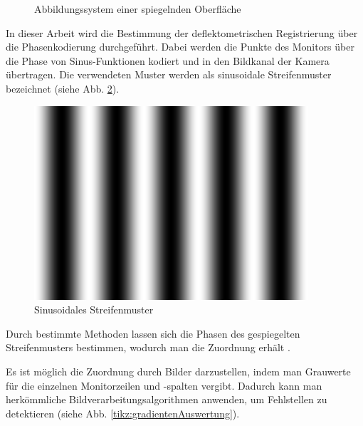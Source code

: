 \documentclass[ngerman,11pt,twocolumn,a4paper]{article}
\begin{document}
\begin{figure}[H]
\begin{adjustbox}{width=\columnwidth}
		\end{adjustbox}
		\caption{Abbildungssystem einer spiegelnden Oberfläche}
		\label{tikz:abbildungssystem}
	\end{figure}
	
	In dieser Arbeit wird die Bestimmung der deflektometrischen Registrierung über die Phasenkodierung durchgeführt.
	Dabei werden die Punkte des Monitors über die Phase von Sinus-Funktionen kodiert und in den Bildkanal der Kamera übertragen.
	Die verwendeten Muster werden als sinusoidale Streifenmuster bezeichnet (siehe Abb. \ref{img:sinusoidalesMuster}).
	\begin{figure}[H]
		 \centering
		 \includegraphics[frame,width=0.4\columnwidth]{m_1_3}
		 \caption{Sinusoidales Streifenmuster}
		 \label{img:sinusoidalesMuster}
	\end{figure}
	
	Durch bestimmte Methoden lassen sich die Phasen des gespiegelten Streifenmusters bestimmen, wodurch man die Zuordnung erhält \cite{kit_werling}.
	
	\par
	Es ist möglich die Zuordnung durch Bilder darzustellen, indem man Grauwerte für die einzelnen Monitorzeilen und -spalten vergibt.
	Dadurch kann man herkömmliche Bildverarbeitungsalgorithmen anwenden, um Fehlstellen zu detektieren (siehe Abb. \ref{tikz:gradientenAuswertung}).
	
\end{document}
